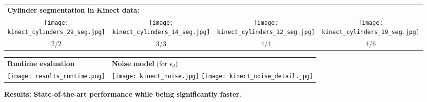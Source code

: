 \documentclass[a0paper,portrait]{baposter}
\newcommand{\HIGHLIGHT}[1]{\textcolor{bonnblue}{{\bf #1}}}
\begin{document}
\begin{poster}
{\begin{center}
      \begin{tabular}{cccc}
        \multicolumn{4}{l}{{\bf Cylinder segmentation in Kinect data:}}\\
        \texttt{[image: kinect\_cylinders\_29\_seg.jpg]} & 
        \texttt{[image: kinect\_cylinders\_14\_seg.jpg]} & 
        \texttt{[image: kinect\_cylinders\_12\_seg.jpg]} & 
        \texttt{[image: kinect\_cylinders\_19\_seg.jpg]} \\[-.3em]
        2/2 & 3/3 & 4/4 & 4/6\\
      \end{tabular}

      \begin{tabular}{ll}
        {\bf Runtime evaluation} & {\bf Noise model} (for $\epsilon_d$)\\
        \texttt{[image: results\_runtime.png]} \hspace{3cm} & 
        \texttt{[image: kinect\_noise.jpg]}
        \texttt{[image: kinect\_noise\_detail.jpg]}
      \end{tabular}
      
    \end{center}




    \textbf{Results:} \HIGHLIGHT{State-of-the-art performance while being significantly faster}.
  }




\end{poster}
\end{document}
